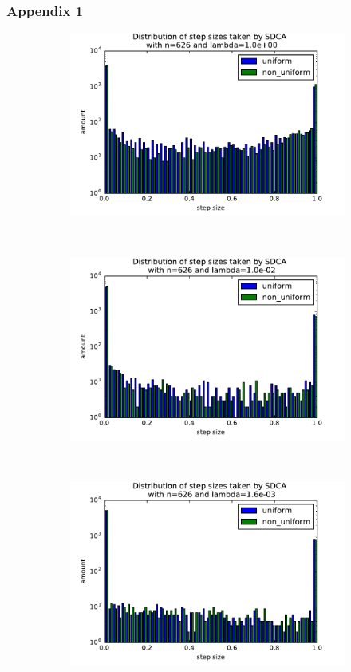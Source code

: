 \documentclass{beamer}
\DeclareMathOperator{\1}{\mathbb{1}}
\begin{document}
\begin{frame}
	\frametitle{Appendix 1}
	\begin{figure}
    \centering
    \begin{subfigure}[t]{0.3\textwidth}
        \centering
        \includegraphics[width=\textwidth]{images/20170914_040255_ocr_stepdistrib.pdf}
    \end{subfigure}
    ~
    \begin{subfigure}[t]{0.3\textwidth}
        \centering
        \includegraphics[width=\textwidth]{images/20170914_041649_ocr_stepdistrib.pdf}
    \end{subfigure}
    ~
    \begin{subfigure}[t]{0.3\textwidth}
        \centering
        \includegraphics[width=\textwidth]{images/20170914_040720_ocr_stepdistrib.pdf}

\end{subfigure}
\end{figure}
\end{frame}
\end{document}
